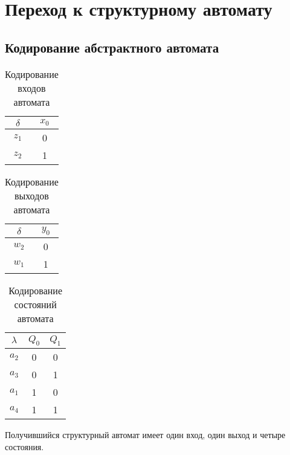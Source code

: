 \documentclass[a4paper,10pt]{article}
\begin{document}
\section*{Переход к структурному автомату}
	\subsection*{Кодирование абстрактного автомата}
		\begin{table}[h!]
			\center
			\begin{tabular}{|c|c|}
				\hline
				  $\delta$ & $x_0$ \\ \hline
					$z_1$  &   0   \\ \hline
					$z_2$  &   1   \\ \hline
			\end{tabular}
			\caption{Кодирование входов автомата}
		\end{table}
		\begin{table}[h!]
			\center
			\begin{tabular}{|c|c|}
				\hline
				  $\delta$ & $y_0$ \\ \hline
					$w_2$  &   0   \\ \hline
					$w_1$  &   1   \\ \hline
			\end{tabular}
			\caption{Кодирование выходов автомата}
		\end{table}

		\begin{table}[h!]
			\center
			\begin{tabular}{|c|c|c|}
				\hline
				  $\lambda$ & $Q_0$ & $Q_1$ \\ \hline
					$a_2$  &   0   &   0   \\ \hline
					$a_3$  &   0   &   1   \\ \hline
					$a_1$  &   1   &   0   \\ \hline
					$a_4$  &   1   &   1   \\ \hline
			\end{tabular}
			\caption{Кодирование состояний автомата}
		\end{table}

		Получившийся структурный автомат имеет один вход, один выход и четыре состояния. \\

\end{document}
